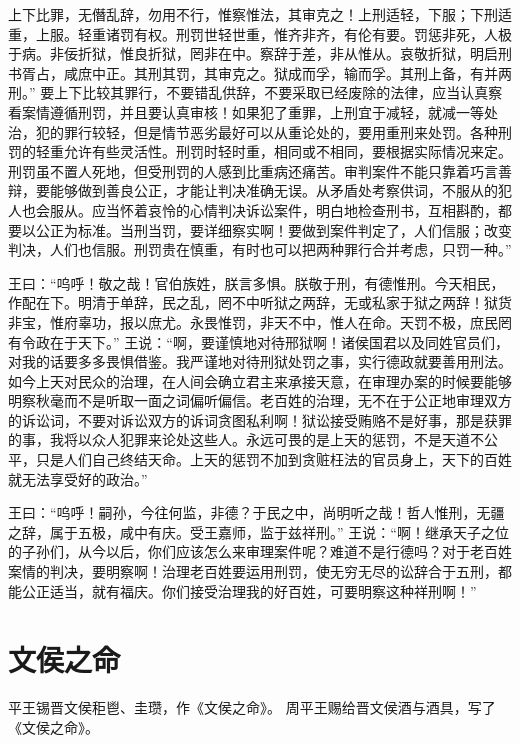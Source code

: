 \documentclass[a4paper,12pt,UTF8,twoside]{ctexbook}
\begin{document}
上下比罪，无僭乱辞，勿用不行，惟察惟法，其审克之！上刑适轻，下服；下刑适重，上服。轻重诸罚有权。刑罚世轻世重，惟齐非齐，有伦有要。罚惩非死，人极于病。非佞折狱，惟良折狱，罔非在中。察辞于差，非从惟从。哀敬折狱，明启刑书胥占，咸庶中正。其刑其罚，其审克之。狱成而孚，输而孚。其刑上备，有并两刑。”
要上下比较其罪行，不要错乱供辞，不要采取已经废除的法律，应当认真察看案情遵循刑罚，并且要认真审核！如果犯了重罪，上刑宜于减轻，就减一等处治，犯的罪行较轻，但是情节恶劣最好可以从重论处的，要用重刑来处罚。各种刑罚的轻重允许有些灵活性。刑罚时轻时重，相同或不相同，要根据实际情况来定。刑罚虽不置人死地，但受刑罚的人感到比重病还痛苦。审判案件不能只靠着巧言善辩，要能够做到善良公正，才能让判决准确无误。从矛盾处考察供词，不服从的犯人也会服从。应当怀着哀怜的心情判决诉讼案件，明白地检查刑书，互相斟酌，都要以公正为标准。当刑当罚，要详细察实啊！要做到案件判定了，人们信服；改变判决，人们也信服。刑罚贵在慎重，有时也可以把两种罪行合并考虑，只罚一种。”

王曰：“呜呼！敬之哉！官伯族姓，朕言多惧。朕敬于刑，有德惟刑。今天相民，作配在下。明清于单辞，民之乱，罔不中听狱之两辞，无或私家于狱之两辞！狱货非宝，惟府辜功，报以庶尤。永畏惟罚，非天不中，惟人在命。天罚不极，庶民罔有令政在于天下。”
王说：“啊，要谨慎地对待邢狱啊！诸侯国君以及同姓官员们，对我的话要多多畏惧借鉴。我严谨地对待刑狱处罚之事，实行德政就要善用刑法。如今上天对民众的治理，在人间会确立君主来承接天意，在审理办案的时候要能够明察秋毫而不是听取一面之词偏听偏信。老百姓的治理，无不在于公正地审理双方的诉讼词，不要对诉讼双方的诉词贪图私利啊！狱讼接受贿赂不是好事，那是获罪的事，我将以众人犯罪来论处这些人。永远可畏的是上天的惩罚，不是天道不公平，只是人们自己终结天命。上天的惩罚不加到贪赃枉法的官员身上，天下的百姓就无法享受好的政治。”

王曰：“呜呼！嗣孙，今往何监，非德？于民之中，尚明听之哉！哲人惟刑，无疆之辞，属于五极，咸中有庆。受王嘉师，监于兹祥刑。”
王说：“啊！继承天子之位的子孙们，从今以后，你们应该怎么来审理案件呢？难道不是行德吗？对于老百姓案情的判决，要明察啊！治理老百姓要运用刑罚，使无穷无尽的讼辞合于五刑，都能公正适当，就有福庆。你们接受治理我的好百姓，可要明察这种祥刑啊！”

\chapter{文侯之命}

平王锡晋文侯秬鬯、圭瓒，作《文侯之命》。
周平王赐给晋文侯酒与酒具，写了《文侯之命》。
\end{document}
